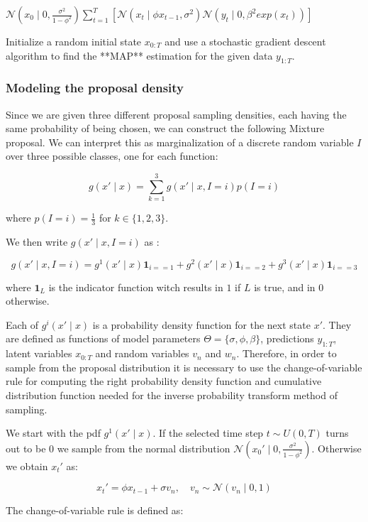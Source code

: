 \documentclass[]{article}
\begin{document}
	$ \mathcal{N}( x_0 \mid 0, \frac{\sigma^2}{1- \phi^2}) \sum_{t=1}^T [ \mathcal{N}(x_t \mid \phi x_{t-1},\sigma^2 ) \mathcal{N}(y_t \mid 0, \beta^2 exp(x_t))] 
	$
	
	Initialize a random initial state $x_{0:T}$ and use a stochastic gradient descent algorithm to find the **MAP** estimation for the given data $y_{1:T}$.
	
	\subsubsection*{Modeling the proposal density}
	
	Since we are given three different proposal sampling densities, each having the same probability of being chosen, we can construct the following Mixture proposal. We can interpret this as marginalization of a discrete random variable $I$ over three possible classes, one for each function:
	
	$$ g(x' \mid x) = \sum_{k=1}^3 g(x' \mid x, I=i) p(I=i) $$
	
	where $p(I=i)=\frac{1}{3}$ for $ k \in \{ 1,2,3 \}$. 
	
	We then write $ g(x' \mid x, I=i) $ as :
	
	$$ g(x' \mid x, I=i) = g^1(x' \mid x)  \mathbf{1}_{i==1} + g^2(x' \mid x)  \mathbf{1}_{i==2} + g^3(x' \mid x)  \mathbf{1}_{i==3}  $$
	
	where $\mathbf{1}_{L}$ is the indicator function witch results in $1$ if $L$ is true, and in $0$ otherwise. 
	
	Each of $g^i(x' \mid x)$ is a probability density function for the next state $x'$. They are defined as functions of model parameters $\Theta = \{ \sigma, \phi, \beta \}$, predictions $y_{1:T}$, latent variables $x_{0:T}$ and random variables $v_n$ and $w_n$. Therefore, in order to sample from the proposal distribution it is necessary to use the change-of-variable rule for computing the right probability density function and cumulative distribution function needed for the inverse probability transform method of sampling. 
	
	We start with the pdf $g^1(x' \mid x)$. If the selected time step $ t \sim U(0,T)$ turns out to be $0$ we sample from the normal distribution $\mathcal{N}(x_0' \mid 0, \frac{\sigma^2}{1-\phi^2})$. Otherwise we obtain $x_t'$ as:
	
	$$ x_t' = \phi x_{t-1} + \sigma v_n , \quad v_n \sim \mathcal{N}(v_n \mid 0,1) $$
	
	The change-of-variable rule is defined as:
	
\end{document}
